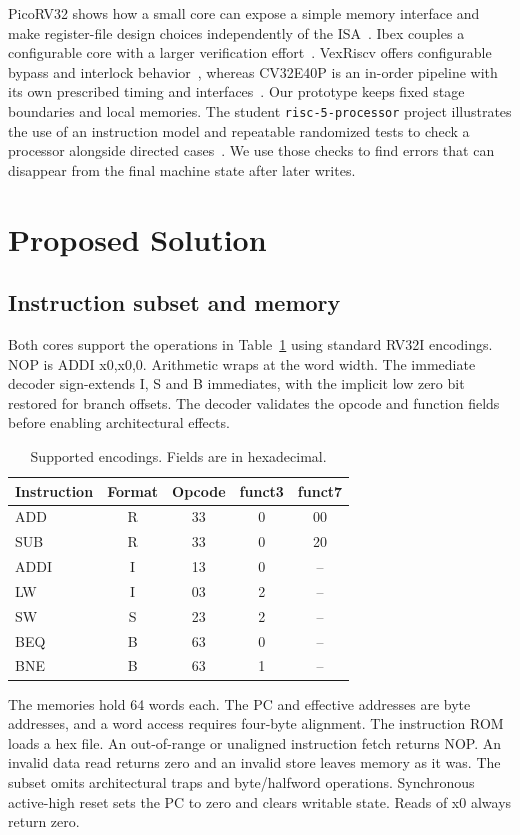 \documentclass[conference]{IEEEtran}
\begin{document}
PicoRV32 shows how a small core can expose a simple memory interface and make register-file design choices independently of the ISA~\cite{pico}. Ibex couples a configurable core with a larger verification effort~\cite{ibex}. VexRiscv offers configurable bypass and interlock behavior~\cite{vex}, whereas CV32E40P is an in-order pipeline with its own prescribed timing and interfaces~\cite{cv}. Our prototype keeps fixed stage boundaries and local memories. The student \texttt{risc-5-processor} project illustrates the use of an instruction model and repeatable randomized tests to check a processor alongside directed cases~\cite{comparison}. We use those checks to find errors that can disappear from the final machine state after later writes.

\section{Proposed Solution}
\subsection{Instruction subset and memory}
Both cores support the operations in Table~\ref{tab:enc} using standard RV32I encodings. NOP is ADDI x0,x0,0. Arithmetic wraps at the word width. The immediate decoder sign-extends I, S and B immediates, with the implicit low zero bit restored for branch offsets. The decoder validates the opcode and function fields before enabling architectural effects.

\begin{table}[t]
\caption{Supported encodings. Fields are in hexadecimal.}
\label{tab:enc}
\centering
\begin{tabular}{lcccc}\hline
Instruction & Format & Opcode & funct3 & funct7\\\hline
ADD  & R & 33 & 0 & 00\\
SUB  & R & 33 & 0 & 20\\
ADDI & I & 13 & 0 & --\\
LW   & I & 03 & 2 & --\\
SW   & S & 23 & 2 & --\\
BEQ  & B & 63 & 0 & --\\
BNE  & B & 63 & 1 & --\\\hline
\end{tabular}
\end{table}

The memories hold 64 words each. The PC and effective addresses are byte addresses, and a word access requires four-byte alignment. The instruction ROM loads a hex file. An out-of-range or unaligned instruction fetch returns NOP. An invalid data read returns zero and an invalid store leaves memory as it was. The subset omits architectural traps and byte/halfword operations. Synchronous active-high reset sets the PC to zero and clears writable state. Reads of x0 always return zero.
\end{document}

